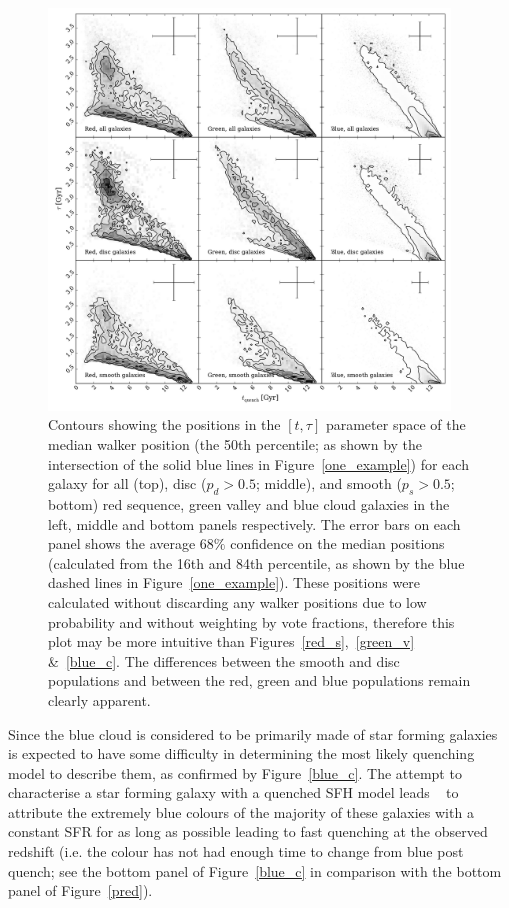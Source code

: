 \begin{figure}
\includegraphics[width=0.95\textwidth]{morphology/contour_t_tau_mcmc_bestfit.pdf}
\caption[Best fit contours for red, green and blue clean galaxies]{Contours showing the positions in the $[t, \tau]$ parameter space of the median walker position (the 50th percentile; as shown by the intersection of the solid blue lines in Figure~\ref{one_example}) for each galaxy for all (top), disc ($p_d > 0.5$; middle), and smooth ($p_s > 0.5$; bottom) red sequence, green valley and blue cloud galaxies in the left, middle and bottom panels respectively. The error bars on each panel shows the average $68\%$ confidence on the median positions (calculated from the 16th and 84th percentile, as shown by the blue dashed lines in Figure~\ref{one_example}). These positions were calculated without discarding any walker positions due to low probability and without weighting by vote fractions, therefore this plot may be more intuitive than Figures~\ref{red_s},~\ref{green_v} \&~\ref{blue_c}. The differences between the smooth and disc populations and between the red, green and blue populations remain clearly apparent.}
\label{fig:bestfit}
\end{figure}

Since the blue cloud is considered to be primarily made of star forming galaxies \starpy~ is expected to have some difficulty in determining the most likely quenching model to describe them, as confirmed by Figure~\ref{blue_c}. The attempt to characterise a star forming galaxy with a quenched SFH model leads \starpy~ to attribute the extremely blue colours of the majority of these galaxies with a constant SFR for as long as possible leading to fast quenching at the observed redshift (i.e. the colour has not had enough time to change from blue post quench; see the bottom panel of Figure~\ref{blue_c} in comparison with the bottom panel of Figure~\ref{pred}).

